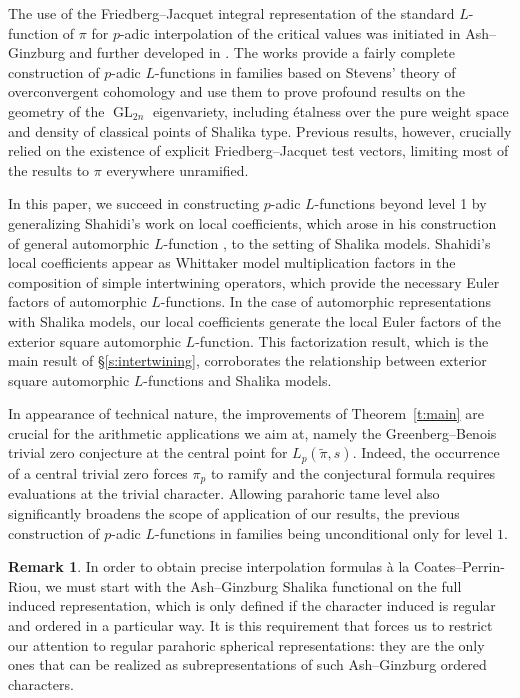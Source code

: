 \documentclass{amsart}
\theoremstyle{definition}
\newtheorem{remark}[thm]{Remark}
\newcommand{\GL}{\operatorname{GL}}
\begin{document}
The use of the Friedberg--Jacquet integral representation of the standard $L$-function of $\pi$ for 
 $p$-adic interpolation of the critical values  was initiated  in Ash--Ginzburg \cite{AG}  and  further developed  in \cite{DJR}.  
 The works  \cite{BDW,BDGJW} provide a fairly complete construction of  $p$-adic $L$-functions in families based on
 Stevens' theory of overconvergent cohomology and  use them to prove profound results on the geometry of the $\GL_{2n}$ eigenvariety,
 including  étalness over the pure weight space and density of classical points of Shalika type.  
Previous results, however, crucially relied  on the existence of   explicit Friedberg--Jacquet test vectors, limiting most of the
  results to $\pi$ everywhere unramified. 

In this paper, we succeed in constructing $p$-adic $L$-functions beyond level 1 by generalizing Shahidi's work on local coefficients, which arose in his construction of general automorphic $L$-function \cite{shahidi:L}, to the setting of Shalika models. Shahidi's local coefficients appear as Whittaker model multiplication factors in the composition of simple intertwining operators, which provide the necessary Euler factors of automorphic $L$-functions. In the case of automorphic representations with Shalika models, our local coefficients generate the local Euler factors of the exterior square automorphic $L$-function. This factorization result, which is the main result of \S \ref{s:intertwining}, corroborates the relationship between exterior square automorphic $L$-functions and Shalika models.

In appearance of  technical nature, the improvements of Theorem~\ref{t:main} are crucial for the arithmetic applications we aim at, namely the 
Greenberg--Benois trivial zero conjecture at the central point for $L_p(\tilde\pi,s)$. 
 Indeed, the occurrence of a central trivial zero forces $\pi_p$ to ramify and the conjectural formula  requires evaluations at the trivial character. 
Allowing  parahoric tame level also significantly broadens the scope of application of our results, the previous construction of $p$-adic $L$-functions in 
families being unconditional  only  for level $1$. 

\begin{remark}
In order to obtain precise interpolation formulas à la Coates--Perrin-Riou, we must start with the Ash--Ginzburg Shalika functional on the full induced representation, which is only defined if the character induced is regular and ordered in a particular way. It is this requirement that forces us to restrict our attention to regular parahoric spherical representations: they are the only ones that can be realized as subrepresentations of such Ash--Ginzburg ordered characters.
\end{remark}
\end{document}
